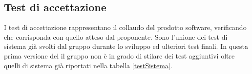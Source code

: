 \subsection{Test di accettazione}
I test di accettazione rappresentano il collaudo del prodotto software, verificando che corrisponda con quello atteso dal proponente. Sono l'unione dei test di sistema già svolti dal gruppo durante lo sviluppo ed ulteriori test finali.
In questa prima versione del \PdQ{} il gruppo non è in grado di stilare dei test aggiuntivi oltre quelli di sistema già riportati nella tabella \ref{testSistema}.